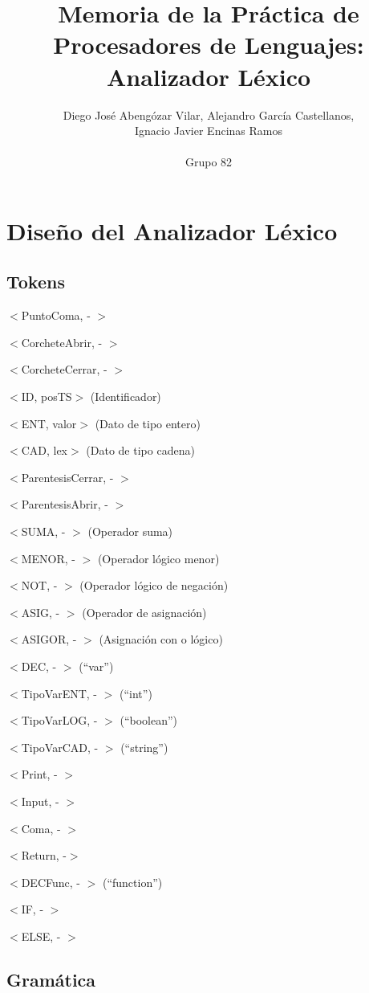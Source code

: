 \documentclass[a4paper, 12pt]{article}
\title{Memoria de la Práctica de Procesadores de Lenguajes: Analizador Léxico}
\author{Diego José Abengózar Vilar, Alejandro García Castellanos,\\ Ignacio Javier Encinas Ramos\\\\Grupo 82}
\begin{document}
\maketitle
\tableofcontents
\newpage

\section{Diseño del Analizador Léxico}

\subsection{Tokens}
\indent

$<$PuntoComa, - $>$

$<$CorcheteAbrir, - $>$ 

$<$CorcheteCerrar, - $>$

$<$ID, posTS$>$ (Identificador)

$<$ENT, valor$>$ (Dato de tipo entero)

$<$CAD, lex$>$ (Dato de tipo cadena)

$<$ParentesisCerrar, - $>$

$<$ParentesisAbrir, - $>$

$<$SUMA, - $>$ (Operador suma)

$<$MENOR, - $>$ (Operador lógico menor)

$<$NOT, - $>$ (Operador lógico de negación)

$<$ASIG, - $>$ (Operador de asignación)

$<$ASIGOR, - $>$ (Asignación con o lógico)

$<$DEC, - $>$ (“var”)

$<$TipoVarENT, - $>$ (“int”)

$<$TipoVarLOG, - $>$ (“boolean”)

$<$TipoVarCAD, - $>$ (“string”)

$<$Print, - $>$

$<$Input, - $>$

$<$Coma, - $>$

$<$Return, -$>$

$<$DECFunc, - $>$ (“function”)

$<$IF, - $>$

$<$ELSE, - $>$
\subsection{Gramática}
\end{document}
